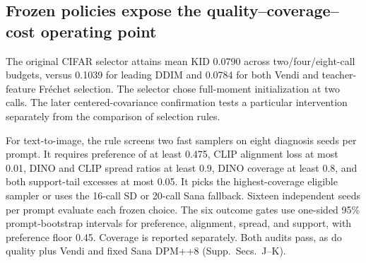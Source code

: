 \subsection{Frozen policies expose the quality--coverage--cost operating point}
\label{sec:policy}
The original CIFAR selector attains mean KID 0.0790 across two/four/eight-call
budgets, versus 0.1039 for leading DDIM and 0.0784 for both Vendi and
teacher-feature Fr\'echet selection. The selector chose full-moment initialization at two calls. The later
centered-covariance confirmation tests a particular intervention separately
from the comparison of selection rules.

For text-to-image, the rule screens two fast samplers on eight diagnosis
seeds per prompt. It requires preference of at least 0.475, CLIP alignment loss
at most 0.01, DINO and CLIP spread ratios at least 0.9, DINO coverage at least 0.8,
and both support-tail excesses at most 0.05. It picks the highest-coverage
eligible sampler or uses the 16-call SD or 20-call Sana fallback. Sixteen
independent seeds per prompt evaluate each frozen choice. The six outcome
gates use one-sided 95\% prompt-bootstrap intervals for preference, alignment,
spread, and support, with preference floor 0.45. Coverage is reported
separately. Both audits pass, as do quality plus Vendi and fixed Sana
DPM++8 (Supp.~Secs.~J--K).


